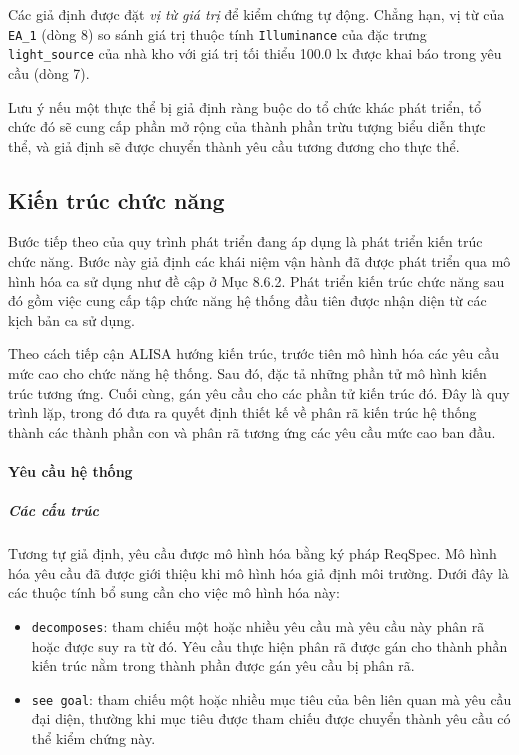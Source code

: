 Các giả định được đặt \emph{vị từ giá trị} để kiểm chứng tự động. Chẳng hạn, vị từ của \texttt{EA\_1} (dòng 8) so sánh giá trị thuộc tính \texttt{Illuminance} của đặc trưng \texttt{light\_source} của nhà kho với giá trị tối thiểu 100.0 lx được khai báo trong yêu cầu (dòng 7).

Lưu ý nếu một thực thể bị giả định ràng buộc do tổ chức khác phát triển, tổ chức đó sẽ cung cấp phần mở rộng của thành phần trừu tượng biểu diễn thực thể, và giả định sẽ được chuyển thành yêu cầu tương đương cho thực thể.

\subsection{Kiến trúc chức năng}
Bước tiếp theo của quy trình phát triển đang áp dụng là phát triển kiến trúc chức năng. Bước này giả định các khái niệm vận hành đã được phát triển qua mô hình hóa ca sử dụng như đề cập ở Mục 8.6.2. Phát triển kiến trúc chức năng sau đó gồm việc cung cấp tập chức năng hệ thống đầu tiên được nhận diện từ các kịch bản ca sử dụng.

Theo cách tiếp cận ALISA hướng kiến trúc, trước tiên mô hình hóa các yêu cầu mức cao cho chức năng hệ thống. Sau đó, đặc tả những phần tử mô hình kiến trúc tương ứng. Cuối cùng, gán yêu cầu cho các phần tử kiến trúc đó. Đây là quy trình lặp, trong đó đưa ra quyết định thiết kế về phân rã kiến trúc hệ thống thành các thành phần con và phân rã tương ứng các yêu cầu mức cao ban đầu.

\paragraph{Yêu cầu hệ thống}
\subparagraph{Các cấu trúc}
Tương tự giả định, yêu cầu được mô hình hóa bằng ký pháp ReqSpec. Mô hình hóa yêu cầu đã được giới thiệu khi mô hình hóa giả định môi trường. Dưới đây là các thuộc tính bổ sung cần cho việc mô hình hóa này:
\begin{itemize}
\item \texttt{decomposes}: tham chiếu một hoặc nhiều yêu cầu mà yêu cầu này phân rã hoặc được suy ra từ đó. Yêu cầu thực hiện phân rã được gán cho thành phần kiến trúc nằm trong thành phần được gán yêu cầu bị phân rã.
\item \texttt{see goal}: tham chiếu một hoặc nhiều mục tiêu của bên liên quan mà yêu cầu đại diện, thường khi mục tiêu được tham chiếu được chuyển thành yêu cầu có thể kiểm chứng này.
\end{itemize}

